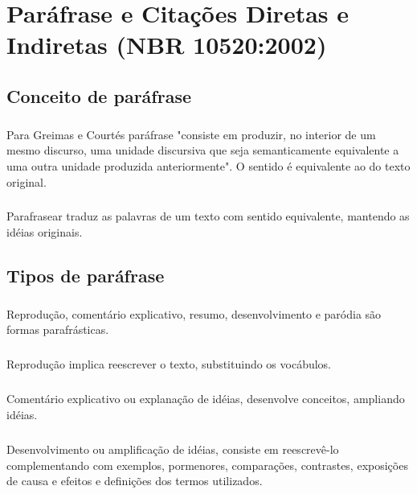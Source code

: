 \chapter{Paráfrase e Citações Diretas e Indiretas (NBR 10520:2002)}

\section{Conceito de paráfrase}

\paragraph{}
Para Greimas e Courtés paráfrase "consiste em produzir, no interior de um mesmo discurso, uma unidade discursiva que seja semanticamente equivalente a uma outra unidade produzida anteriormente". O sentido é equivalente ao do texto original. 

\paragraph{}
Parafrasear traduz as palavras de um texto com sentido equivalente, mantendo as idéias originais.

\section{Tipos de paráfrase}

\paragraph{}
Reprodução, comentário explicativo, resumo, desenvolvimento e paródia são formas parafrásticas.

\paragraph{}
Reprodução implica reescrever o texto, substituindo os vocábulos.

\paragraph{}
Comentário explicativo ou explanação de idéias, desenvolve conceitos, ampliando idéias.

\paragraph{}
Desenvolvimento ou amplificação de idéias, consiste em reescrevê-lo complementando com exemplos, pormenores, comparações, contrastes, exposições de causa e efeitos e definições dos termos utilizados.

